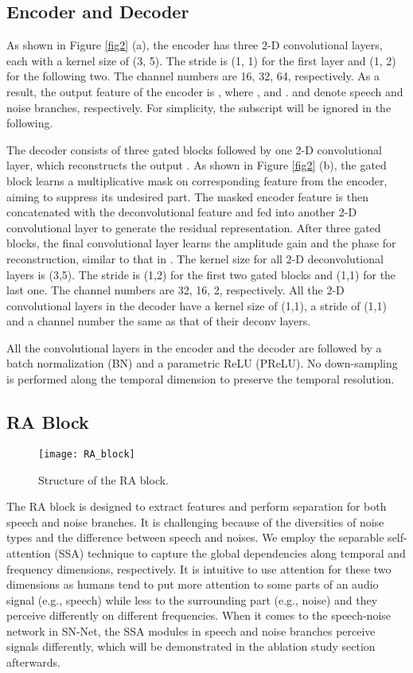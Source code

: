 \documentclass[letterpaper]{article} \usepackage{snnet}  \usepackage{times}  \usepackage{helvet} \usepackage{courier}  \usepackage[hyphens]{url}  \usepackage{graphicx} \urlstyle{rm} \def\UrlFont{\rm}  \usepackage{graphicx}  \usepackage{natbib}  \usepackage{caption} \usepackage{amsfonts}  \usepackage{amsmath}  \usepackage{multirow} \usepackage{tablefootnote}  \usepackage[switch]{lineno}
\begin{document}
\subsection{Encoder and Decoder}

\noindent As shown in Figure \ref{fig2} (a), the encoder has three 2-D convolutional layers, each with a kernel size of (3, 5). The stride is (1, 1) for the first layer and (1, 2) for the following two. The channel numbers are 16, 32, 64, respectively. As a result, the output feature of the encoder is , where ,  and .  and  denote speech and noise branches, respectively. For simplicity, the subscript  will be ignored in the following.

The decoder consists of three gated blocks followed by one 2-D convolutional layer, which reconstructs the output . As shown in Figure \ref{fig2} (b), the gated block learns a multiplicative mask on corresponding feature from the encoder, aiming to suppress its undesired part. The masked encoder feature is then concatenated with the deconvolutional feature and fed into another 2-D convolutional layer to generate the residual representation. After three gated blocks, the final convolutional layer learns the amplitude gain and the phase for reconstruction, similar to that in \cite{choi2019phase}. The kernel size for all 2-D deconvolutional layers is (3,5). The stride is (1,2) for the first two gated blocks and (1,1) for the last one. The channel numbers are 32, 16, 2, respectively. All the 2-D convolutional layers in the decoder have a kernel size of (1,1), a stride of (1,1) and a channel number the same as that of their deconv layers.

All the convolutional layers in the encoder and the decoder are followed by a batch normalization (BN) and a parametric ReLU (PReLU). No down-sampling is performed along the temporal dimension to preserve the temporal resolution.

\subsection{RA Block}

\begin{figure}[t]
    \centering
    \texttt{[image: RA\_block]}
    \caption{Structure of the RA block.}
    \label{fig3}
\end{figure}

\noindent The RA block is designed to extract features and perform separation for both speech and noise branches. It is challenging because of the diversities of noise types and the difference between speech and noises. We employ the separable self-attention (SSA) technique to capture the global dependencies along temporal and frequency dimensions, respectively. It is intuitive to use attention for these two dimensions as humans tend to put more attention to some parts of an audio signal (e.g., speech) while less to the surrounding part (e.g., noise) and they perceive differently on different frequencies. When it comes to the speech-noise network in SN-Net, the SSA modules in speech and noise branches perceive signals differently, which will be demonstrated in the ablation study section afterwards. 
\end{document}
